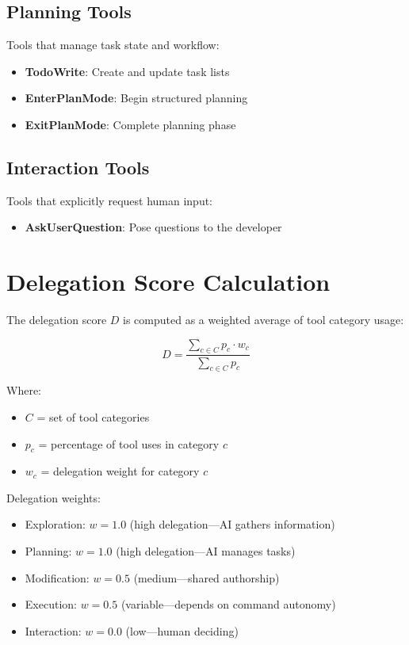 \documentclass{ntlabs-preprint}
\begin{document}
\subsection{Planning Tools}
Tools that manage task state and workflow:
\begin{itemize}
    \item \textbf{TodoWrite}: Create and update task lists
    \item \textbf{EnterPlanMode}: Begin structured planning
    \item \textbf{ExitPlanMode}: Complete planning phase
\end{itemize}

\subsection{Interaction Tools}
Tools that explicitly request human input:
\begin{itemize}
    \item \textbf{AskUserQuestion}: Pose questions to the developer
\end{itemize}

\section{Delegation Score Calculation}

The delegation score $D$ is computed as a weighted average of tool category usage:

\begin{equation}
D = \frac{\sum_{c \in C} p_c \cdot w_c}{\sum_{c \in C} p_c}
\end{equation}

Where:
\begin{itemize}
    \item $C$ = set of tool categories
    \item $p_c$ = percentage of tool uses in category $c$
    \item $w_c$ = delegation weight for category $c$
\end{itemize}

Delegation weights:
\begin{itemize}
    \item Exploration: $w = 1.0$ (high delegation---AI gathers information)
    \item Planning: $w = 1.0$ (high delegation---AI manages tasks)
    \item Modification: $w = 0.5$ (medium---shared authorship)
    \item Execution: $w = 0.5$ (variable---depends on command autonomy)
    \item Interaction: $w = 0.0$ (low---human deciding)
\end{itemize}
\end{document}
